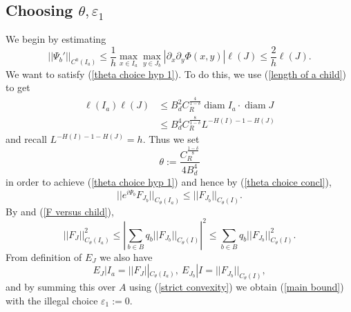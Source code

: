 \documentclass[reqno,10pt]{amsart}
\DeclareMathOperator{\diam}{diam}
\theoremstyle{definition}
\numberwithin{equation}{section}
\begin{document}
\subsection{Choosing \texorpdfstring{$\theta, \varepsilon_1$}{theta and epsilon1}}
We begin by estimating 
\begin{equation}\label{Psi in C1}
||\Psi_b'||_{C^0(I_a)} \leq \frac{1}{h} \max_{x \in I_a} \max_{y \in J_b} |\partial_x \partial_y \Phi(x, y)| \ell(J) \leq \frac{2}{h} \ell(J).
\end{equation}
We want to satisfy (\ref{theta choice hyp 1}). To do this, we use (\ref{length of a child}) to get 
\begin{align*}
\ell(I_a) \ell(J) &\leq B_d^2 C_R^{\frac{4}{1 - \delta}} \diam I_a \cdot \diam J\\
&\leq B_d^4 C_R^{\frac{8}{1 - \delta}} L^{-H(I) - 1 - H(J)}
\end{align*}
and recall $L^{-H(I)-1-H(J)} = h$. Thus we set 
\begin{equation}\label{choice of theta}
\theta := \frac{C_R^{\frac{1 - \delta}{8}}}{4B_d^4}
\end{equation}
in order to achieve (\ref{theta choice hyp 1}) and hence by (\ref{theta choice concl}),
\begin{equation}\label{Psi is bounded}
||e^{i\Psi_b} F_{J_b}||_{C_\theta(I_a)} \leq ||F_{J_b}||_{C_\theta(I)}.
\end{equation}
By \cite[(2.15)]{Dyatlov_2018} and (\ref{F versus child}),
\begin{equation}\label{strict convexity}
||F_J||_{C_\theta(I_a)}^2 \leq \left|\sum_{b \in B} q_b ||F_{J_b}||_{C_\theta(I)}\right|^2 \leq \sum_{b \in B} q_b ||F_{J_b}||_{C_\theta(I)}^2.
\end{equation}
From definition of $E_J$ we also have 
\begin{equation}\label{disjointness of E}
E_J|I_a = ||F_J||_{C_\theta(I_a)}, ~ E_{J_b}|I = ||F_{J_b}||_{C_\theta(I)},
\end{equation}
and by summing this over $A$ using (\ref{strict convexity}) we obtain (\ref{main bound}) with the illegal choice $\varepsilon_1 := 0$.
\end{document}
